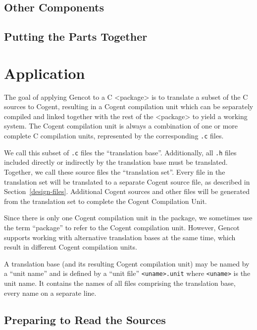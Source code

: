 \documentclass[a4paper]{report}
\newcommand{\code}[1]{\textnormal{\texttt{#1}}}
\begin{document}
\section{Other Components}
\label{impl-ocomps}


\section{Putting the Parts Together}
\label{impl-all}


\chapter{Application}

The goal of applying Gencot to a C <package> is to translate a subset of the C sources to Cogent,
resulting in a Cogent compilation unit which can be separately compiled and linked together with
the rest of the <package> to yield a working system. The Cogent compilation unit is always a
combination of one or more complete C compilation units, represented by the corresponding \code{.c} 
files.

We call this subset of \code{.c} files the ``translation base''. Additionally, all \code{.h} files
included directly or indirectly by the translation base must be translated. Together, we call these
source files the ``translation set''. Every file in the translation set will be translated to a 
separate Cogent source file, as described in Section~\ref{design-files}. Additional Cogent sources
and other files will be generated from the translation set to complete the Cogent Compilation Unit.

Since there is only one Cogent compilation unit in the package, we sometimes use the term ``package''
to refer to the Cogent compilation unit. However, Gencot supports working with alternative 
translation bases at the same time, which result in different Cogent compilation units.

A translation base (and its resulting Cogent compilation unit) may be named by a ``unit name'' and
is defined by a ``unit file'' \code{<uname>.unit} where \code{<uname>} is the unit name. It contains 
the names of all files comprising the translation base, every name on a separate line. 

\section{Preparing to Read the Sources}
\label{app-prep}
%
\end{document}
